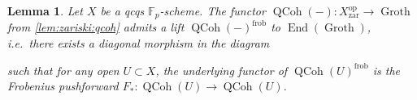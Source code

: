 \documentclass{article}
\theoremstyle{definition}
\theoremstyle{definition}
\theoremstyle{definition}
\theoremstyle{plain}
\newtheorem{lem}[defn]{Lemma}
\theoremstyle{plain}
\theoremstyle{plain}
\theoremstyle{plain}
\theoremstyle{plain}
\theoremstyle{plain}
\theoremstyle{plain}
\theoremstyle{plain}
\theoremstyle{remark}
\theoremstyle{remark}
\theoremstyle{plain}
\theoremstyle{plain}
\theoremstyle{plain}
\theoremstyle{plain}
\theoremstyle{plain}
\newcommand{\Fp}{\mathbb{F}_p}
\newcommand{\op}[1]{#1^{\operatorname{op}}}
\newcommand{\QCoh}[1]{\operatorname{QCoh}(#1)}
\newcommand{\End}[1]{\operatorname{End}(#1)}
\newcommand{\Groth}{\operatorname{Groth}}
\newcommand{\zar}{\operatorname{zar}}
\newcommand{\frob}{\operatorname{frob}}
\begin{document}
\begin{lem} \label{lem:zariski:qcoh-frob}
    Let $X$ be a qcqs $\Fp$-scheme.
    The functor $\QCoh{-} \colon \op{X}_{\zar} \to \Groth$ from \cref{lem:zariski:qcoh}
    admits a lift $\QCoh{-}^{\frob}$ to $\End{\Groth}$, i.e.\ there exists a diagonal morphism in the diagram
    \begin{center}
    \end{center}
    such that for any open $U \subset X$, the underlying functor of $\QCoh{U}^{\frob}$ 
    is the Frobenius pushforward $F_* \colon \QCoh{U} \to \QCoh{U}$.
\end{lem}
\end{document}
